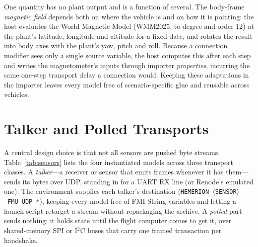 \documentclass[preprint,12pt,a4paper]{elsarticle}
\newcommand{\code}[1]{\texttt{\small #1}}
\begin{document}
One quantity has no plant output and is a function of several. The body-frame
\emph{magnetic field} depends both on where the vehicle is and on how it is
pointing: the host evaluates the World Magnetic Model
(WMM2025, to degree and order 12) at the plant's latitude, longitude and
altitude for a fixed date, and rotates the result into body axes with the
plant's yaw, pitch and roll. Because a connection modifier sees only a single
source variable, the host computes this after each step and writes the
magnetometer's inputs through importer \emph{properties}, incurring the same
one-step transport delay a connection would. Keeping these adaptations in the
importer leaves every model free of scenario-specific glue and reusable across
vehicles.

\section{Talker and Polled Transports}
\label{sec:transport}
A central design choice is that not all sensors are pushed byte streams.
Table~\ref{tab:sensors} lists the four instantiated models across three
transport classes. A \emph{talker}---a receiver or sensor that emits frames
whenever it has them---sends its bytes over UDP, standing in for a UART RX line
(or Renode's emulated one). The environment supplies each talker's destination
(\code{HEMERION\_$\langle$SENSOR$\rangle$\_FMU\_UDP\_*}), keeping every model
free of FMI String variables and letting a launch script retarget a stream
without repackaging the archive. A \emph{polled} part sends nothing: it holds
state until the flight computer comes to get it, over shared-memory SPI or
I$^2$C buses that carry one framed transaction per handshake.
\end{document}
